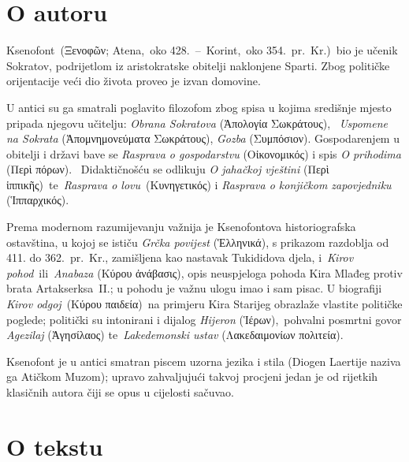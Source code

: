 \section*{O autoru}

Ksenofont \textgreek[variant=ancient]{(Ξενοφῶν}; Atena, oko 428. – Korint, oko 354. pr.~Kr.)\ bio je učenik Sokratov, podrijetlom iz aristokratske obitelji naklonjene Sparti. Zbog političke orijentacije veći dio života proveo je izvan domovine. 

U antici su ga smatrali poglavito filozofom zbog spisa u kojima središnje mjesto pripada njegovu učitelju: \textit{Obrana Sokratova} \textgreek[variant=ancient]{(Ἀπολογία Σωκράτους),}  \textit{Uspomene na Sokrata} \textgreek[variant=ancient]{(Ἀπομνημονεύματα Σωκράτους),} \textit{Gozba} \textgreek[variant=ancient]{(Συμπόσιον).} Gospodarenjem u obitelji i državi bave se \textit{Rasprava o gospodarstvu} \textgreek[variant=ancient]{(Οἰκονομικός)} i spis \textit{O prihodima} \textgreek[variant=ancient]{(Περὶ πόρων).}  Didaktičnošću se odlikuju \textit{O jahačkoj vještini} \textgreek[variant=ancient]{(Περὶ ἱππικῆς)} te \textit{Rasprava o lovu} \textgreek[variant=ancient]{(Κυνηγετικός)} i \textit{Ras\-pra\-va o konjičkom zapovjedniku} \textgreek[variant=ancient]{(Ἱππαρχικός).}

Prema modernom razumijevanju važnija je Ksenofontova historiografska ostavština, u kojoj se ističu \textit{Grčka povijest} \textgreek[variant=ancient]{(Ἑλληνικά),} s prikazom razdoblja od 411. do 362. pr.~Kr., zamišljena kao nastavak Tukididova djela, i \textit{Kirov pohod} ili \textit{A\-na\-baza} \textgreek[variant=ancient]{(Κύρου ἀνάβασις),} opis neuspjeloga pohoda Kira Mlađeg protiv brata Artakserksa II.; u pohodu je važnu ulogu imao i sam pisac. U biografiji \textit{Kirov odgoj} \textgreek[variant=ancient]{(Κύρου παιδεία)} na primjeru Kira Starijeg obrazlaže vlastite političke poglede; politički su intonirani i dijalog \textit{Hijeron} \textgreek[variant=ancient]{(Ἱέρων),} pohvalni posmrtni govor \textit{Agezilaj} \textgreek[variant=ancient]{(Ἀγησίλαος)} te \textit{Lakedemonski ustav} \textgreek[variant=ancient]{(Λακεδαιμονίων πολιτεία)}.

Ksenofont je u antici smatran piscem uzorna jezika i stila (Diogen Laertije naziva ga Atičkom Muzom); upravo zahvaljujući takvoj procjeni jedan je od rijetkih klasičnih autora čiji se opus u cijelosti sačuvao.

\section*{O tekstu}

